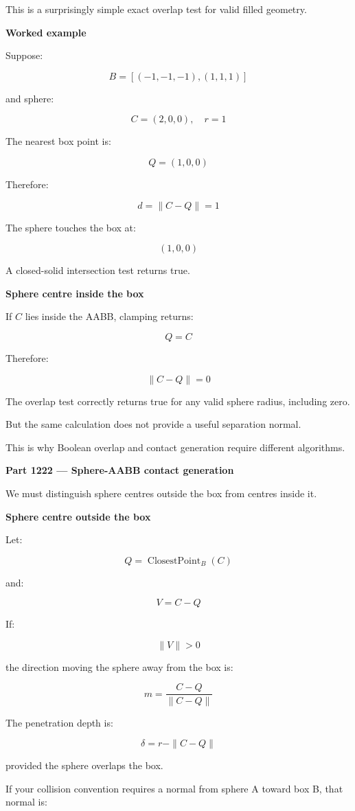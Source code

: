 This is a surprisingly simple exact overlap test for valid filled geometry.

\textbf{Worked example}

Suppose:

\[
B=[(-1,-1,-1),(1,1,1)]
\]

and sphere:

\[
C=(2,0,0),\quad r=1
\]

The nearest box point is:

\[
Q=(1,0,0)
\]

Therefore:

\[
d=\|C-Q\|=1
\]

The sphere touches the box at:

\[
(1,0,0)
\]

A closed-solid intersection test returns true.

\textbf{Sphere centre inside the box}

If \(C\) lies inside the AABB, clamping returns:

\[
Q=C
\]

Therefore:

\[
\|C-Q\|=0
\]

The overlap test correctly returns true for any valid sphere radius, including zero.

But the same calculation does not provide a useful separation normal.

This is why Boolean overlap and contact generation require different algorithms.

\textbf{Part 1222 --- Sphere-AABB contact generation}

We must distinguish sphere centres outside the box from centres inside it.

\textbf{Sphere centre outside the box}

Let:

\[
Q=\operatorname{ClosestPoint}_{B}(C)
\]

and:

\[
V=C-Q
\]

If:

\[
\|V\|>0
\]

the direction moving the sphere away from the box is:

\[
\boxed{ m=\frac{C-Q}{\|C-Q\|} }
\]

The penetration depth is:

\[
\boxed{ \delta=r-\|C-Q\| }
\]

provided the sphere overlaps the box.

If your collision convention requires a normal from sphere A toward box B, that normal is:

